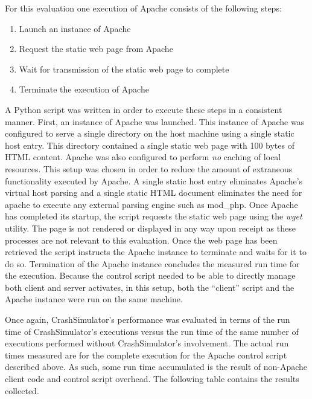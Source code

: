                 For this evaluation one execution of Apache consists of the following steps:

                \begin{enumerate}
                    \item{} Launch an instance of Apache
                    \item{} Request the static web page from Apache
                    \item{} Wait for transmission of the static web page to complete
                    \item{} Terminate the execution of Apache
                \end{enumerate}

                A Python script was written in order to execute these steps in a consistent manner. First, an instance
                of Apache was launched. This instance of Apache was configured to serve a single directory on the host
                machine using a single static host entry. This directory contained a single static web page with 100
                bytes of HTML content. Apache was also configured to perform \emph{no} caching of local resources. This
                setup was chosen in order to reduce the amount of extraneous functionality executed by Apache. A single
                static host entry eliminates Apache's virtual host parsing and a single static HTML document eliminates
                the need for apache to execute any external parsing engine such as mod\_php. Once Apache has completed
                its startup, the script requests the static web page using the \emph{wget} utility. The page is not
                rendered or displayed in any way upon receipt as these processes are not relevant to this evaluation.
                Once the web page has been retrieved the script instructs the Apache instance to terminate and waits for
                it to do so. Termination of the Apache instance concludes the measured run time for the execution.
                Because the control script needed to be able to directly manage both client and server activates, in
                this setup, both the ``client'' script and the Apache instance were run on the same machine.

                Once again, CrashSimulator's performance was evaluated in terms of the run time of CrashSimulator's
                executions versus the run time of the same number of executions performed without CrashSimulator's
                involvement. The actual run times measured are for the complete execution for the Apache control script
                described above. As such, some run time accumulated is the result of non-Apache client code and control
                script overhead. The following table contains the results collected.

